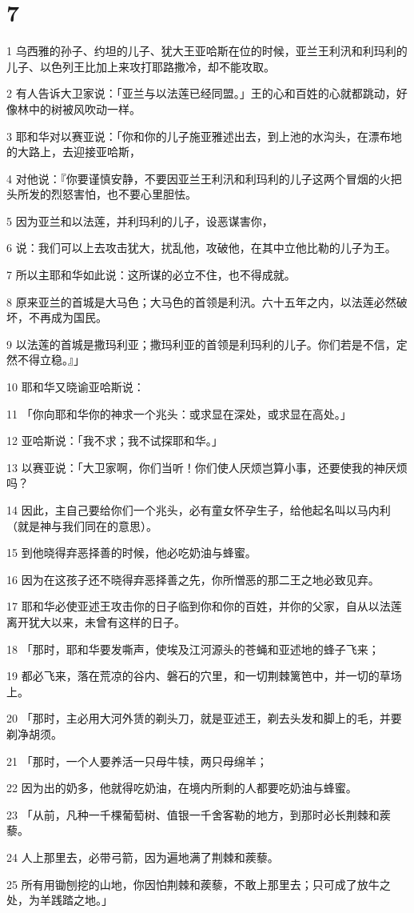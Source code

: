 \chapter{7}

\par 1 乌西雅的孙子、约坦的儿子、犹大王亚哈斯在位的时候，亚兰王利汛和利玛利的儿子、以色列王比加上来攻打耶路撒冷，却不能攻取。
\par 2 有人告诉大卫家说：「亚兰与以法莲已经同盟。」王的心和百姓的心就都跳动，好像林中的树被风吹动一样。
\par 3 耶和华对以赛亚说：「你和你的儿子施亚雅述出去，到上池的水沟头，在漂布地的大路上，去迎接亚哈斯，
\par 4 对他说：『你要谨慎安静，不要因亚兰王利汛和利玛利的儿子这两个冒烟的火把头所发的烈怒害怕，也不要心里胆怯。
\par 5 因为亚兰和以法莲，并利玛利的儿子，设恶谋害你，
\par 6 说：我们可以上去攻击犹大，扰乱他，攻破他，在其中立他比勒的儿子为王。
\par 7 所以主耶和华如此说：这所谋的必立不住，也不得成就。
\par 8 原来亚兰的首城是大马色；大马色的首领是利汛。六十五年之内，以法莲必然破坏，不再成为国民。
\par 9 以法莲的首城是撒玛利亚；撒玛利亚的首领是利玛利的儿子。你们若是不信，定然不得立稳。』」
\par 10 耶和华又晓谕亚哈斯说：
\par 11 「你向耶和华你的神求一个兆头：或求显在深处，或求显在高处。」
\par 12 亚哈斯说：「我不求；我不试探耶和华。」
\par 13 以赛亚说：「大卫家啊，你们当听！你们使人厌烦岂算小事，还要使我的神厌烦吗？
\par 14 因此，主自己要给你们一个兆头，必有童女怀孕生子，给他起名叫以马内利（就是神与我们同在的意思）。
\par 15 到他晓得弃恶择善的时候，他必吃奶油与蜂蜜。
\par 16 因为在这孩子还不晓得弃恶择善之先，你所憎恶的那二王之地必致见弃。
\par 17 耶和华必使亚述王攻击你的日子临到你和你的百姓，并你的父家，自从以法莲离开犹大以来，未曾有这样的日子。
\par 18 「那时，耶和华要发嘶声，使埃及江河源头的苍蝇和亚述地的蜂子飞来；
\par 19 都必飞来，落在荒凉的谷内、磐石的穴里，和一切荆棘篱笆中，并一切的草场上。
\par 20 「那时，主必用大河外赁的剃头刀，就是亚述王，剃去头发和脚上的毛，并要剃净胡须。
\par 21 「那时，一个人要养活一只母牛犊，两只母绵羊；
\par 22 因为出的奶多，他就得吃奶油，在境内所剩的人都要吃奶油与蜂蜜。
\par 23 「从前，凡种一千棵葡萄树、值银一千舍客勒的地方，到那时必长荆棘和蒺藜。
\par 24 人上那里去，必带弓箭，因为遍地满了荆棘和蒺藜。
\par 25 所有用锄刨挖的山地，你因怕荆棘和蒺藜，不敢上那里去；只可成了放牛之处，为羊践踏之地。」

